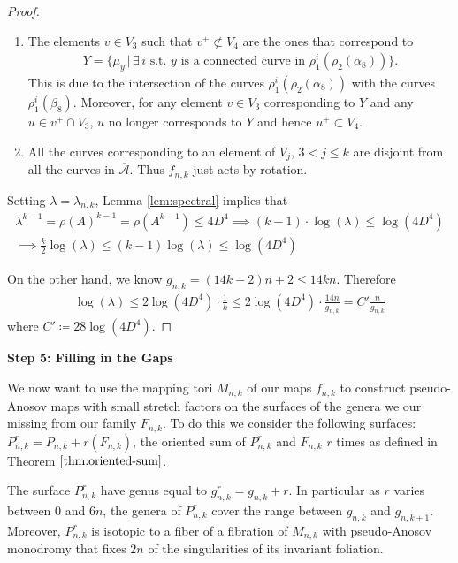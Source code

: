 \begin{proof}
\begin{enumerate}
    \item The elements $v \in V_3$ such that $v^+ \not\subset V_4$ are the ones that correspond to
    \begin{align*}
        Y = \{\mu_y \,\vert\, \exists \,i \text{ s.t. $y$ is a connected curve in } \rho_1^i(\rho_2(\alpha_8))\}.
    \end{align*}
    This is due to the intersection of the curves $\rho_1^i(\rho_2(\alpha_8))$ with the curves $\rho_1^i(\beta_8)$. Moreover, for any element $v \in V_3$ corresponding to $Y$ and any $u \in v^+ \cap V_3$, $u$ no longer corresponds to $Y$ and hence $u^+ \subset V_4$.
    
    \item All the curves corresponding to an element of $V_j$, $3 < j \leq k$ are disjoint from all the curves in $\overline{\mathcal{A}}$. Thus $f_{n,k}$ just acts by rotation.
\end{enumerate}

Setting $\lambda = \lambda_{n,k}$, Lemma \ref{lem:spectral} implies that
\begin{gather*}
    \lambda^{k-1} = \rho(A)^{k-1} = \rho(A^{k-1}) \leq 4D^4 \implies (k-1)\cdot \log(\lambda) \leq \log(4D^4) \\
    \implies \frac{k}{2}\log(\lambda) \leq (k-1)\log(\lambda) \leq \log(4D^4)
\end{gather*}

On the other hand, we know $g_{n,k} = (14k - 2)n + 2 \leq 14kn$. Therefore
\begin{align*}
    \log(\lambda) \leq 2\log(4D^4)\cdot\frac{1}{k} \leq 2\log(4D^4)\cdot \frac{14n}{g_{n,k}} = C'\frac{n}{g_{n,k}}
\end{align*}
where $C' \coloneqq 28\log(4D^4)$.
\end{proof}

\begin{center}
\textbf{Step 5: Filling in the Gaps}
\end{center}

We now want to use the mapping tori $M_{n,k}$ of our maps $f_{n,k}$ to construct pseudo-Anosov maps with small stretch factors on the surfaces of the genera we our missing from our family $F_{n,k}$. To do this we consider the following surfaces: $P^r_{n,k} = P_{n,k} + r(F_{n,k})$, the oriented sum of $P^r_{n,k}$ and $F_{n,k}$ $r$ times as defined in Theorem $\ref{thm:oriented-sum}$.

\begin{lem}
The surface $P^r_{n,k}$ have genus equal to $g^r_{n,k} = g_{n,k} + r$. In particular as $r$ varies between $0$ and $6n$, the genera of $P^r_{n,k}$ cover the range between $g_{n,k}$ and $g_{n,k+1}$. Moreover, $P^r_{n,k}$ is isotopic to a fiber of a fibration of $M_{n,k}$ with pseudo-Anosov monodromy that fixes $2n$ of the singularities of its invariant foliation.
\end{lem}

